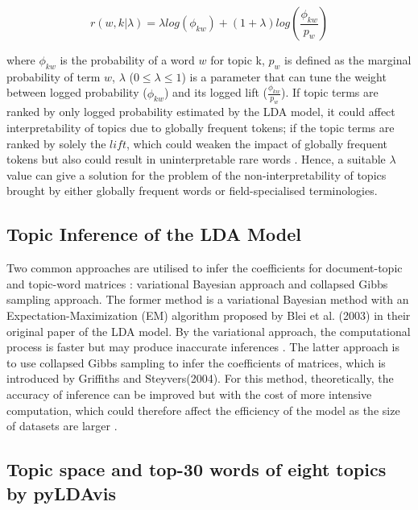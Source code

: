 \begin{equation}
  r(w,k|\lambda) = \lambda log(\phi_{kw}) + (1+\lambda)log(\frac{\phi_{kw}}{p_w})
\end{equation}

where $\phi_{kw}$ is the probability of a word $w$ for topic k, $p_w$ is defined as the marginal probability of term $w$, $\lambda$ ($0 \leq \lambda \leq 1$) is a parameter that can tune the weight between logged probability ($\phi_{kw}$) and its logged lift ($\frac{\phi_{kw}}{p_w}$). If topic terms are ranked by only logged probability estimated by the LDA model, it could affect interpretability of topics due to globally frequent tokens; if the topic terms are ranked by solely the $lift$, which could weaken the impact of globally frequent tokens but also could result in uninterpretable rare words \cite{taddy2011estimation}. Hence, a suitable $\lambda$ value can give a solution for the problem of the non-interpretability of topics brought by either globally frequent words or field-specialised terminologies.

\subsection*{Topic Inference of the LDA Model}

Two common approaches are utilised to infer the coefficients for document-topic and topic-word matrices \cite{gibbs_lda}: variational Bayesian approach and collapsed Gibbs sampling approach. The former method is a variational Bayesian method with an Expectation-Maximization (EM) algorithm proposed by Blei et al. (2003) \cite{LDA} in their original paper of the LDA model. By the variational approach, the computational process is faster but may produce inaccurate inferences \cite{jordan1999}. The latter approach is to use collapsed Gibbs sampling to infer the coefficients of matrices, which is introduced by Griffiths and Steyvers(2004). For this method, theoretically, the accuracy of inference can be improved but with the cost of more intensive computation, which could therefore affect the efficiency of the model as the size of datasets are larger \cite{gibbs_lda}.

\subsection*{Topic space and top-30 words of eight topics by pyLDAvis}

